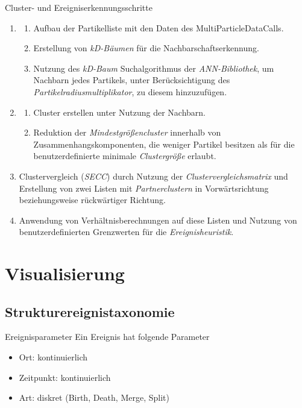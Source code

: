 \documentclass[10pt]{beamer}
\newcommand{\wichtig}[1]{\textit{#1}}
\begin{document}
\begin{frame}{Cluster- und Ereigniserkennungsschritte}
	\begin{enumerate}
		\item
		\begin{enumerate}
			\item Aufbau der Partikelliste mit den Daten des MultiParticleDataCalls.
			\item Erstellung von \wichtig{kD-Bäumen} für die Nachbarschaftserkennung.
			\item Nutzung des \wichtig{kD-Baum} Suchalgorithmus der \wichtig{ANN-Bibliothek}, um Nachbarn jedes Partikels, unter Berücksichtigung des \wichtig{Partikelradiusmultiplikator}, zu diesem hinzuzufügen.
		\end{enumerate}
		\item
		\begin{enumerate}
			\item Cluster erstellen unter Nutzung der Nachbarn.
			\item Reduktion der \wichtig{Mindestgrößencluster} innerhalb von Zusammenhangskomponenten, die weniger Partikel besitzen als für die benutzerdefinierte minimale \wichtig{Clustergröße} erlaubt.
		\end{enumerate}
		\item Clustervergleich (\wichtig{SECC}) durch Nutzung der \wichtig{Clustervergleichsmatrix} und Erstellung von zwei Listen mit \wichtig{Partnerclustern} in Vorwärtsrichtung beziehungsweise rückwärtiger Richtung.
		\item Anwendung von Verhältnisberechnungen auf diese Listen und Nutzung von benutzerdefinierten Grenzwerten für die \wichtig{Ereignisheuristik}.
	\end{enumerate}
\end{frame}

\section{Visualisierung}

\subsection{Strukturereignistaxonomie}
\begin{frame}{Ereignisparameter}
	Ein Ereignis hat folgende Parameter
	\begin{itemize}
		\item Ort: kontinuierlich
		\item Zeitpunkt: kontinuierlich
		\item Art: diskret (Birth, Death, Merge, Split)
	\end{itemize}
\end{frame}
\end{document}
